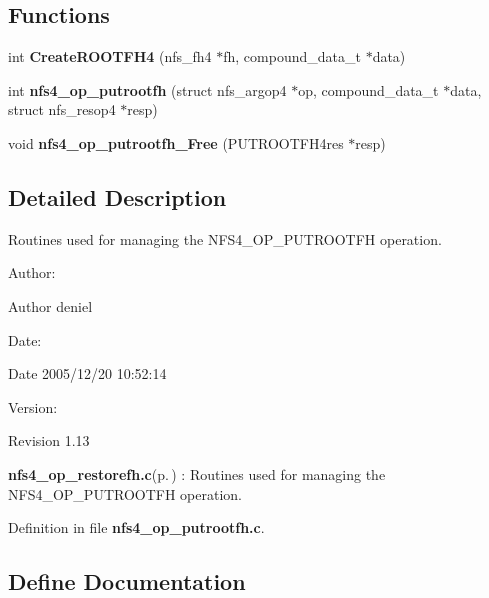 \subsection*{Functions}
\begin{CompactItemize}
\item 
int {\bf Create\-ROOTFH4} (nfs\_\-fh4 $\ast$fh, compound\_\-data\_\-t $\ast$data)
\item 
int {\bf nfs4\_\-op\_\-putrootfh} (struct nfs\_\-argop4 $\ast$op, compound\_\-data\_\-t $\ast$data, struct nfs\_\-resop4 $\ast$resp)
\item 
void {\bf nfs4\_\-op\_\-putrootfh\_\-Free} (PUTROOTFH4res $\ast$resp)
\end{CompactItemize}


\subsection{Detailed Description}
Routines used for managing the NFS4\_\-OP\_\-PUTROOTFH operation. 

\begin{Desc}
\item[Author:]\begin{Desc}
\item[Author]deniel \end{Desc}
\end{Desc}
\begin{Desc}
\item[Date:]\begin{Desc}
\item[Date]2005/12/20 10:52:14 \end{Desc}
\end{Desc}
\begin{Desc}
\item[Version:]\begin{Desc}
\item[Revision]1.13 \end{Desc}
\end{Desc}
{\bf nfs4\_\-op\_\-restorefh.c}{\rm (p.\,\pageref{nfs4__op__restorefh_8c})} : Routines used for managing the NFS4\_\-OP\_\-PUTROOTFH operation.

Definition in file {\bf nfs4\_\-op\_\-putrootfh.c}.

\subsection{Define Documentation}
